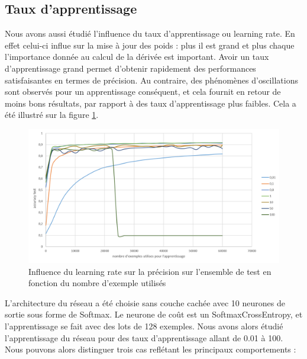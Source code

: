 \documentclass{report}
\theoremstyle{plain}
\theoremstyle{definition}
\theoremstyle{remark}
\begin{document}
\subsection{Taux d'apprentissage}
Nous avons aussi étudié l'influence du taux d'apprentissage ou learning rate. En effet celui-ci influe sur la mise à jour des poids : plus il est grand et plus chaque l'importance donnée au calcul de la dérivée est important. Avoir un taux d'apprentissage grand permet d’obtenir rapidement des performances satisfaisantes en termes de précision. Au contraire, des phénomènes d'oscillations sont observés pour un apprentissage conséquent, et cela fournit en retour de moins bons résultats, par rapport à des taux d'apprentissage plus faibles. Cela a été illustré sur la figure \ref{influence_learningrate}.

\begin{figure}[!h]
\begin{center}
\includegraphics[scale=0.6]{images/influence_learningrate.png}
\caption{Influence du learning rate sur la précision sur l'ensemble de test en fonction du nombre d'exemple utilisés}
\label{influence_learningrate}
\end{center}
\end{figure}

L'architecture du réseau a été choisie sans couche cachée avec 10 neurones de sortie sous forme de Softmax. Le neurone de coût est un SoftmaxCrossEntropy, et l'apprentissage se fait avec des lots de 128 exemples. Nous avons alors étudié l'apprentissage du réseau pour des taux d'apprentissage allant de 0.01 à 100.
Nous pouvons alors distinguer trois cas reflétant les principaux comportements :
\end{document}
